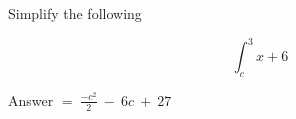 Simplify the following

\[\int_{c}^{3}{x + 6}\]

Answer \(= \ \frac{{- c}^{2}}{2}\  - \ 6c\  + \ 27\)
